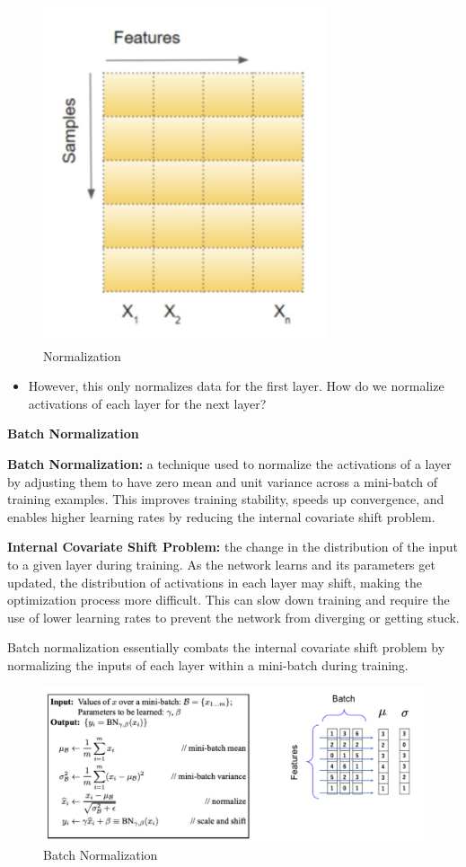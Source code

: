 \begin{figure}[h!t]
    \centering
    \includegraphics[width=0.3\linewidth]{normalization.png}
    \caption{Normalization}
    \label{fig:enter-label}
\end{figure}
\begin{itemize}
    \item However, this only normalizes data for the first layer. How do we normalize activations of each layer for the next layer?
\end{itemize}

\noindent\textbf{Batch Normalization}

\begin{definition}
    \textbf{Batch Normalization:} a technique used to normalize the activations of a layer by adjusting them to have zero mean and unit variance across a mini-batch of training examples. This improves training stability, speeds up convergence, and enables higher learning rates by reducing the internal covariate shift problem.
\end{definition}

\begin{theorem}
    \textbf{Internal Covariate Shift Problem:}  the change in the distribution of the input to a given layer during training. As the network learns and its parameters get updated, the distribution of activations in each layer may shift, making the optimization process more difficult. This can slow down training and require the use of lower learning rates to prevent the network from diverging or getting stuck.
\end{theorem}

Batch normalization essentially combats the internal covariate shift problem by normalizing the inputs of each layer within a mini-batch during training.

\begin{figure}[h!t]
    \centering
    \includegraphics[width=0.75\linewidth]{batchnormalization.png}
    \caption{Batch Normalization}
    \label{fig:enter-label}
\end{figure}

